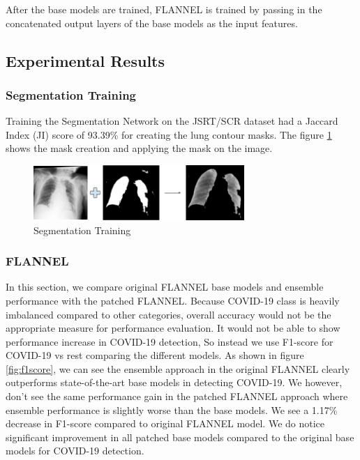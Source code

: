 \documentclass{sigkddExp}
\begin{document}
After the base models are trained, FLANNEL is trained by passing in the
concatenated output layers of the base models as the input features.

\subsection{Experimental Results}
\subsubsection{Segmentation Training}
Training the Segmentation Network on the JSRT/SCR dataset had a Jaccard Index
(JI) score of 93.39\% for creating the lung contour masks. The figure \ref{fig:segtrain}
shows the mask creation and applying the mask on the image.

\begin{figure}[h]
    \includegraphics[width=8cm]{../doc/images/segmentation_training.png}
    \caption{Segmentation Training}
    \label{fig:segtrain}
\end{figure}

\subsubsection{FLANNEL}

In this section, we compare original FLANNEL base models and ensemble
performance with the patched FLANNEL. Because COVID-19 class is heavily
imbalanced compared to other categories, overall accuracy would not be the
appropriate measure for performance evaluation. It would not be able to show
performance increase in COVID-19 detection, So instead we use F1-score for COVID-19
vs rest comparing the different models. As shown in figure \ref{fig:f1score}, we
can see the ensemble approach in the original FLANNEL clearly outperforms
state-of-the-art base models in detecting COVID-19. We however, don’t see the
same performance gain in the patched FLANNEL approach where ensemble performance
is slightly worse than the base models. We see a 1.17\% decrease in F1-score
compared to original FLANNEL model. We do notice significant improvement in all patched base
models compared to the original base models for COVID-19 detection.
\end{document}
